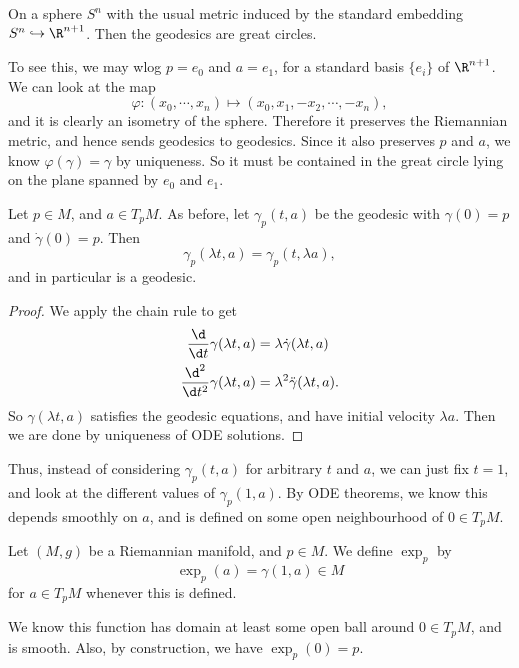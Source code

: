 \documentclass[a4paper]{article}
\begin{document}
\begin{eg}
  On a sphere $S^n$ with the usual metric induced by the standard embedding $S^n \hookrightarrow \R^{n + 1}$. Then the geodesics are great circles.

  To see this, we may wlog $p = e_0$ and $a = e_1$, for a standard basis $\{e_i\}$ of $\R^{n + 1}$. We can look at the map
  \[
    \varphi: (x_0, \cdots, x_n) \mapsto (x_0, x_1, -x_2, \cdots, -x_n),
  \]
  and it is clearly an isometry of the sphere. Therefore it preserves the Riemannian metric, and hence sends geodesics to geodesics. Since it also preserves $p$ and $a$, we know $\varphi(\gamma) = \gamma$ by uniqueness. So it must be contained in the great circle lying on the plane spanned by $e_0$ and $e_1$.
\end{eg}

\begin{lemma}
  Let $p \in M$, and $a \in T_p M$. As before, let $\gamma_p(t, a)$ be the geodesic with $\gamma(0) = p$ and $\dot{\gamma}(0) = p$. Then
  \[
    \gamma_p(\lambda t, a) = \gamma_p(t, \lambda a),
  \]
  and in particular is a geodesic.
\end{lemma}

\begin{proof}
  We apply the chain rule to get
  \begin{align*}
    \frac{\d}{\d t} \gamma(\lambda t, a) &= \lambda \dot{\gamma} (\lambda t, a)\\
    \frac{\d^2}{\d t^2} \gamma(\lambda t, a) &= \lambda^2 \ddot{\gamma}(\lambda t, a).
  \end{align*}
  So $\gamma(\lambda t, a)$ satisfies the geodesic equations, and have initial velocity $\lambda a$. Then we are done by uniqueness of ODE solutions.
\end{proof}

Thus, instead of considering $\gamma_p(t, a)$ for arbitrary $t$ and $a$, we can just fix $t = 1$, and look at the different values of $\gamma_p(1, a)$. By ODE theorems, we know this depends smoothly on $a$, and is defined on some open neighbourhood of $0 \in T_p M$.

\begin{defi}
  Let $(M, g)$ be a Riemannian manifold, and $p \in M$. We define $\exp_p$ by
  \[
    \exp_p(a) = \gamma(1, a) \in M
  \]
  for $a \in T_p M$ whenever this is defined.
\end{defi}

We know this function has domain at least some open ball around $0 \in T_p M$, and is smooth. Also, by construction, we have $\exp_p(0) = p$.
\end{document}
